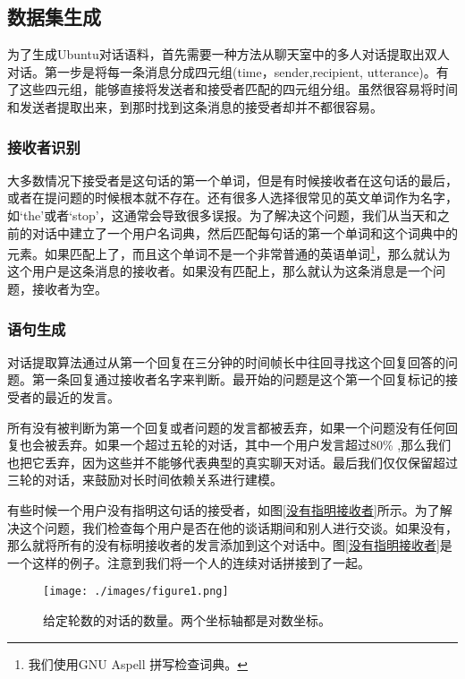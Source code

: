 \documentclass{article}
\begin{document}
\begin{multicols}{2}
		\subsection{数据集生成}
		
		为了生成Ubuntu对话语料，首先需要一种方法从聊天室中的多人对话提取出双人对话。第一步是将每一条消息分成四元组(time，sender,recipient, utterance)。有了这些四元组，能够直接将发送者和接受者匹配的四元组分组。虽然很容易将时间和发送者提取出来，到那时找到这条消息的接受者却并不都很容易。
		
		\subsubsection{接收者识别}
		大多数情况下接受者是这句话的第一个单词，但是有时候接收者在这句话的最后，或者在提问题的时候根本就不存在。还有很多人选择很常见的英文单词作为名字，如‘the’或者‘stop’，这通常会导致很多误报。为了解决这个问题，我们从当天和之前的对话中建立了一个用户名词典，然后匹配每句话的第一个单词和这个词典中的元素。如果匹配上了，而且这个单词不是一个非常普通的英语单词\footnote{我们使用GNU Aspell 拼写检查词典。}，那么就认为这个用户是这条消息的接收者。如果没有匹配上，那么就认为这条消息是一个问题，接收者为空。
		
	
		\subsubsection{语句生成}
		
		对话提取算法通过从第一个回复在三分钟的时间帧长中往回寻找这个回复回答的问题。第一条回复通过接收者名字来判断。最开始的问题是这个第一个回复标记的接受者的最近的发言。
		
		所有没有被判断为第一个回复或者问题的发言都被丢弃，如果一个问题没有任何回复也会被丢弃。如果一个超过五轮的对话，其中一个用户发言超过80\% ,那么我们也把它丢弃，因为这些并不能够代表典型的真实聊天对话。最后我们仅仅保留超过三轮的对话，来鼓励对长时间依赖关系进行建模。
		
		有些时候一个用户没有指明这句话的接受者，如图\ref{没有指明接收者}所示。为了解决这个问题，我们检查每个用户是否在他的谈话期间和别人进行交谈。如果没有，那么就将所有的没有标明接收者的发言添加到这个对话中。图\ref{没有指明接收者}是一个这样的例子。注意到我们将一个人的连续对话拼接到了一起。
		
		\begin{figure}[H]
			\centering
			\texttt{[image: ./images/figure1.png]}
			\caption{给定轮数的对话的数量。两个坐标轴都是对数坐标。}
			\label{数量与轮数的关系}
		\end{figure}
		

\end{multicols}
\end{document}
